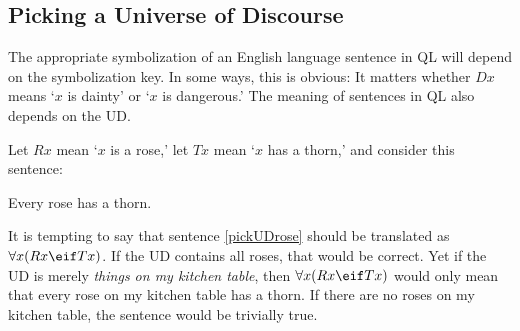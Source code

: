 \begin{table}[h!]
\end{table}

\subsection{Picking a Universe of Discourse}
The appropriate symbolization of an English language sentence in QL will depend on the symbolization key. In some ways, this is obvious: It matters whether $Dx$ means `$x$ is dainty' or `$x$ is dangerous.' The meaning of sentences in QL also depends on the UD.

Let $Rx$ mean `$x$ is a rose,' let $Tx$ mean `$x$ has a thorn,' and consider this sentence:
\begin{earg}
\item[\ex{pickUDrose}] Every rose has a thorn.
\end{earg}

It is tempting to say that sentence \ref{pickUDrose} should be translated as $\forall x(Rx \eif Tx)$. If the UD contains all roses, that would be correct. Yet if the UD is merely \emph{things on my kitchen table}, then $\forall x(Rx \eif Tx)$ would only mean that every rose on my kitchen table has a thorn. If there are no roses on my kitchen table, the sentence would be trivially true.





